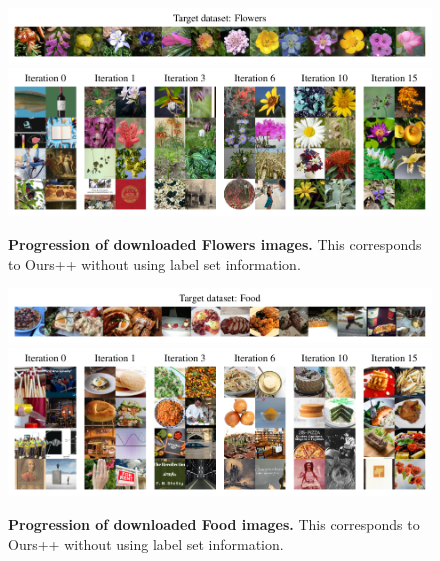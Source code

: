 \begin{figure}
    \centering
    \includegraphics{figures/flowers_targets.pdf} \\
    \vspace{-0.8em}
    \includegraphics{figures/flowers-progression-1150-2col.pdf}
    \caption{\textbf{Progression of downloaded Flowers images.} This corresponds to Ours++ without using label set information. }
    \label{fig:flowers_progression}
\end{figure}

\begin{figure}
    \centering
    \includegraphics{figures/food_targets.pdf} \\
    \vspace{-0.8em}
    \includegraphics{figures/food-progression-1148-2col.pdf}
    \caption{\textbf{Progression of downloaded Food images.} This corresponds to Ours++ without using label set information. }
    \label{fig:food_progression}
\end{figure}

